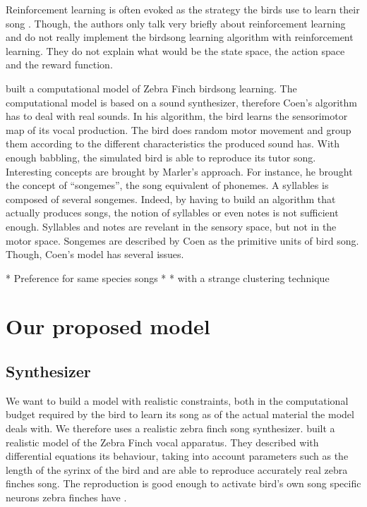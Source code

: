 \documentclass{report}
\begin{document}
Reinforcement learning is often evoked as the strategy the birds use to learn
their song \parencite{dave_song_2000,marler_three_1997}. Though,
the authors only talk very briefly about reinforcement learning and do not
really implement the birdsong learning algorithm with reinforcement learning.
They do not explain what would be the state space, the action space and the
reward function.

\textcite{marler_three_1997} built a computational model of Zebra Finch birdsong
learning. The computational model is based on a sound synthesizer, therefore
Coen's algorithm has to deal with real sounds. In his algorithm, the bird learns
the sensorimotor map of its vocal production. The bird does random motor
movement and group them according to the different characteristics the produced
sound has. With enough babbling, the simulated bird is able to reproduce its
tutor song. Interesting concepts are brought by Marler's approach. For instance,
he brought the concept of ``songemes'', the song equivalent of phonemes. A
syllables is composed of several songemes. Indeed, by having to build an
algorithm that actually produces songs, the notion of syllables or even notes is
not sufficient enough. Syllables and notes are revelant in the sensory space,
but not in the motor space. Songemes are described by Coen as the primitive
units of bird song. Though, Coen's model has several issues.

* Preference for same species songs \cite{margoliash_evaluating_2002,
marler_three_1997}
* \cite{marler_three_1997}
* \cite{coen_learning_2007} with a strange clustering technique



\chapter{Our proposed model}

\section{Synthesizer}

We want to build a model with realistic constraints, both in the computational
budget required by the bird to learn its song as of the actual material the
model deals with. We therefore uses a realistic zebra finch song synthesizer.
\textcite{perl_reconstruction_2011} built a realistic model of the Zebra Finch
vocal apparatus. They described with differential equations its behaviour,
taking into account parameters such as the length of the syrinx of the bird
 and are able to reproduce accurately real zebra finches
song. The reproduction is good enough to activate bird's own song specific
neurons zebra finches have \parencite{boari_automatic_2015}.
\end{document}
